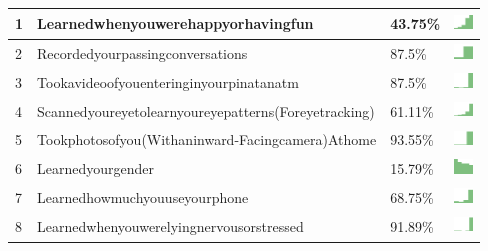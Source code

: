 \documentclass[a4paper,12pt]{article}
\begin{document}
\begin{longtable}{| p{0.5cm} | p{7cm} | p{1cm} | c |}
\hline
1 & Learnedwhenyouwerehappyorhavingfun & 43.75\% & \includegraphics[width = 0.5cm, height = 0.5cm]{learnedwhenyouwerehappyorhavingfunWORKCONTACTS} \\ \hline 
2 & Recordedyourpassingconversations & 87.5\% & \includegraphics[width = 0.5cm, height = 0.5cm]{recordedyourpassingconversationsWORKCONTACTS} \\ \hline 
3 & Tookavideoofyouenteringinyourpinatanatm & 87.5\% & \includegraphics[width = 0.5cm, height = 0.5cm]{tookavideoofyouenteringinyourPINatanATMWORKCONTACTS} \\ \hline 
4 & Scannedyoureyetolearnyoureyepatterns(Foreyetracking) & 61.11\% & \includegraphics[width = 0.5cm, height = 0.5cm]{scannedyoureyetolearnyoureyepatterns(foreyetracking)WORKCONTACTS} \\ \hline 
5 & Tookphotosofyou(Withaninward-Facingcamera)Athome & 93.55\% & \includegraphics[width = 0.5cm, height = 0.5cm]{tookphotosofyou(withaninward-facingcamera)athomeWORKCONTACTS} \\ \hline 
6 & Learnedyourgender & 15.79\% & \includegraphics[width = 0.5cm, height = 0.5cm]{learnedyourgenderWORKCONTACTS} \\ \hline 
7 & Learnedhowmuchyouuseyourphone & 68.75\% & \includegraphics[width = 0.5cm, height = 0.5cm]{learnedhowmuchyouuseyourphoneWORKCONTACTS} \\ \hline 
8 & Learnedwhenyouwerelyingnervousorstressed & 91.89\% & \includegraphics[width = 0.5cm, height = 0.5cm]{learnedwhenyouwerelyingnervousorstressedWORKCONTACTS} \\ \hline 

\end{longtable}
\end{document}
